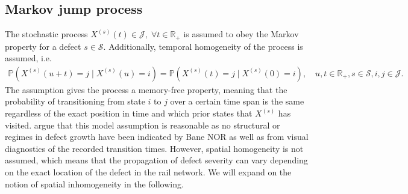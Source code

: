 \subsection{Markov jump process} \label{sec:mjp}
The stochastic process $X^{(s)}(t) \in \mathcal{J}, \; \forall t \in \mathbb R_+$ is assumed to obey the Markov property for a defect $s \in \mathcal S$. Additionally, temporal homogeneity of the process is assumed, i.e.
\begin{align}
    \mathds{P} \left(X^{(s)}(u+t) = j \mid X^{(s)}(u) = i \right) =  \mathds{P} \left( X^{(s)}(t) = j \mid X^{(s)}(0) = i \right), \quad u,t\in \mathbb R_+, s \in \mathcal S, i,j \in \mathcal{J}. \label{eq:markov_property}
\end{align}
The assumption gives the process a memory-free property, meaning that the probability of transitioning from state $i$ to $j$ over a certain time span is the same regardless of the exact position in time and which prior states that $X^{(s)}$ has visited. \citet{bisgaard2024A} argue that this model assumption is reasonable as no structural or regimes in defect growth have been indicated by Bane NOR as well as from visual diagnostics of the recorded transition times.
However, spatial homogeneity is not assumed, which means that the propagation of defect severity can vary depending on the exact location of the defect in the rail network. We will expand on the notion of spatial inhomogeneity in the following.

